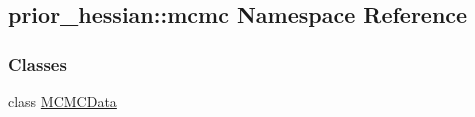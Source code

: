 \hypertarget{namespaceprior__hessian_1_1mcmc}{}\subsection{prior\+\_\+hessian\+:\+:mcmc Namespace Reference}
\label{namespaceprior__hessian_1_1mcmc}
\subsubsection*{Classes}
\begin{DoxyCompactItemize}
\item 
class \hyperlink{classprior__hessian_1_1mcmc_1_1MCMCData}{M\+C\+M\+C\+Data}
\end{DoxyCompactItemize}
